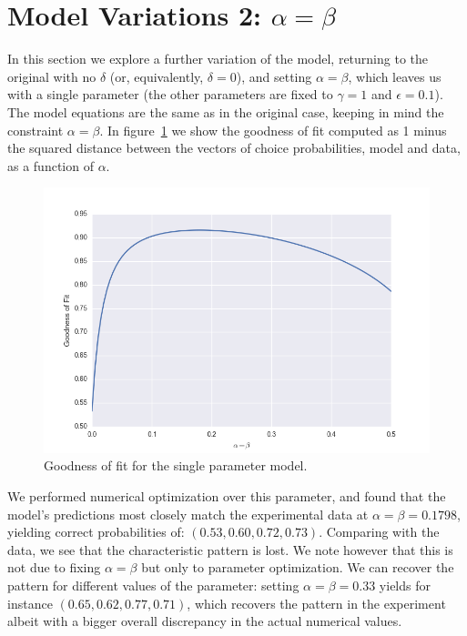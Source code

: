 \documentclass[11pt, a4paper]{article}
\begin{document}
 
 
\section*{Model Variations 2: $\alpha=\beta$}
In this section we explore a further variation of the model, returning to the original with no $\delta$ (or, equivalently, $\delta=0$), and setting $\alpha=\beta$, which leaves us with a single parameter (the other parameters are fixed to $\gamma=1$ and $\epsilon=0.1$). The model equations are the same as in the original case, keeping in mind the constraint $\alpha=\beta$. In figure~\ref{fig:GoF1} we show the goodness of fit computed as 1 minus the squared distance between the vectors of choice probabilities, model and data, as a function of $\alpha$.
\begin{figure}[ht]
\centering
\includegraphics[width=12cm]{Figures/GoF_alpha.png}
\caption{Goodness of fit for the single parameter model.}
\label{fig:GoF1}
\end{figure} 

We performed numerical optimization over this parameter, and found that the model's predictions most closely match the experimental data at $\alpha=\beta=0.1798$, yielding correct probabilities of:  $(0.53, 0.60, 0.72, 0.73)$. Comparing with the data, we see that the characteristic pattern is lost. We note however that this is not due to fixing $\alpha=\beta$ but only to parameter optimization. We can recover the pattern for different values of the parameter: setting $\alpha=\beta=0.33$ yields for instance $(0.65, 0.62, 0.77, 0.71)$, which recovers the pattern in the experiment albeit with a bigger overall discrepancy in the actual numerical values. 




 
\end{document}
